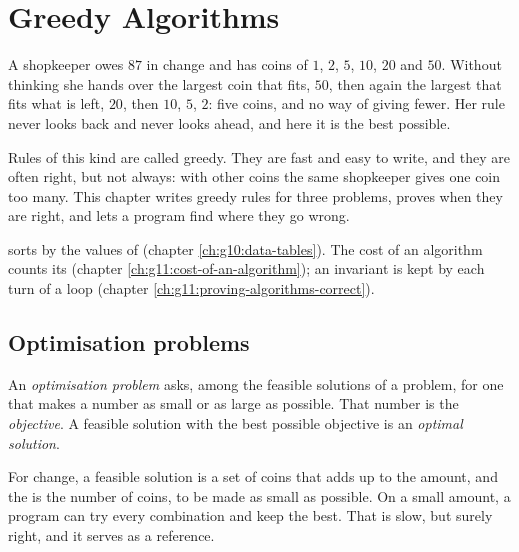 \chapter{Greedy Algorithms}\label{ch:g11:greedy-algorithms}

A shopkeeper owes $87$ in change and has coins of $1$, $2$, $5$, $10$, $20$ and $50$. Without thinking she hands over
the largest coin that fits, $50$, then again the largest that fits what is left, $20$, then $10$, $5$, $2$: five
coins, and no way of giving fewer. Her rule never looks back and never looks ahead, and here it is the best possible.

Rules of this kind are called greedy. They are fast and easy to write, and they are often right, but not always: with
other coins the same shopkeeper gives one coin too many. This chapter writes greedy rules for three problems, proves
when they are right, and lets a program find where they go wrong.

\begin{recall}
 sorts by the values of  (chapter \ref{ch:g10:data-tables}). The cost
of an algorithm counts its  (chapter \ref{ch:g11:cost-of-an-algorithm}); an invariant is kept by
each turn of a loop (chapter \ref{ch:g11:proving-algorithms-correct}).
\end{recall}

\section{Optimisation problems}\label{sec:g11:greedy-algorithms:optimisation}

\begin{definition}\label{def:g11:greedy-algorithms:optimisation}
An \emph{optimisation problem} asks, among the feasible solutions of a problem, for one
that makes a number as small or as large as possible. That number is the \emph{objective}. A
feasible solution with the best possible objective is an \emph{optimal solution}.
\end{definition}

For change, a feasible solution is a set of coins that adds up to the amount, and the  is the number of
coins, to be made as small as possible. On a small amount, a program can try every combination and keep the best.
That is slow, but surely right, and it serves as a reference.

